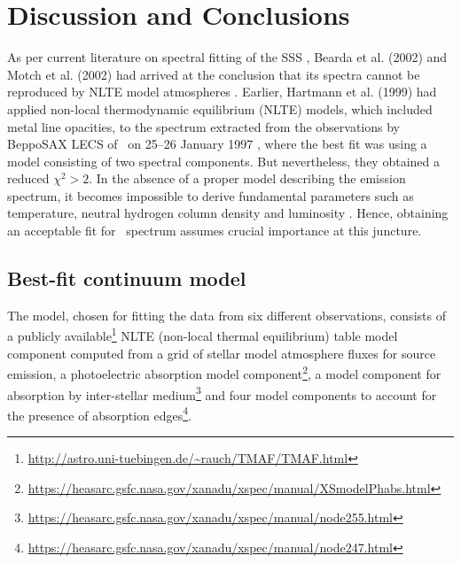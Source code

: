 \section{Discussion and Conclusions}
	As per current literature on spectral fitting of the SSS \source, Bearda et al. (2002) and Motch et al. (2002) had arrived at the conclusion that its spectra cannot be reproduced by NLTE model atmospheres \cite{beardaChandra2002AA,motchXmmNewton2002AA}. Earlier, Hartmann et al. (1999) had applied non-local thermodynamic equilibrium (NLTE) models, which included metal line opacities, to the spectrum extracted from the observations by BeppoSAX LECS of \source\ on 25--26 January 1997 \cite{hartmann1999constraining}, where the best fit was using a model consisting of two spectral components. But nevertheless, they obtained a reduced $\chi^2>2$. In the absence of a proper model describing the emission spectrum, it becomes impossible to
derive fundamental parameters such as temperature, neutral hydrogen column density and luminosity \cite{motchXmmNewton2002AA}. Hence, obtaining an acceptable fit for \source\ spectrum assumes crucial importance at this juncture.
%			
	
	\subsection{Best-fit continuum model}
	The model, chosen for fitting the data from six different observations, consists of a publicly available\footnote{\url{http://astro.uni-tuebingen.de/~rauch/TMAF/TMAF.html}} NLTE (non-local thermal equilibrium) table model component computed from a grid of stellar model atmosphere fluxes for source emission, a photoelectric absorption model component\footnote{\url{https://heasarc.gsfc.nasa.gov/xanadu/xspec/manual/XSmodelPhabs.html}}, a model component for absorption by inter-stellar medium\footnote{\url{https://heasarc.gsfc.nasa.gov/xanadu/xspec/manual/node255.html}} and four model components to account for the presence of absorption edges\footnote{\url{https://heasarc.gsfc.nasa.gov/xanadu/xspec/manual/node247.html}}.
	
